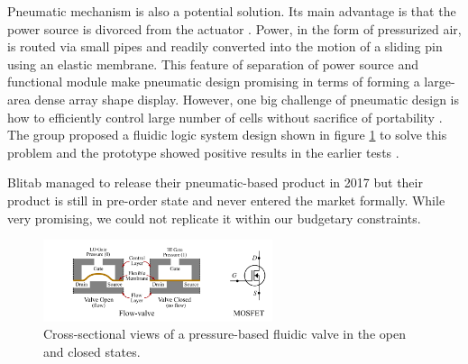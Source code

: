 Pneumatic mechanism is also a potential solution.
Its main advantage is that the power source is divorced from the actuator \cite{russomanno_design_2015}.
Power, in the form of pressurized air, is routed via small pipes and readily converted into the motion of a sliding pin using an elastic membrane.
This feature of separation of power source and functional module make pneumatic design promising in terms of forming a large-area dense array shape display.
However, one big challenge of pneumatic design is how to efficiently control large number of cells without sacrifice of portability \cite{russomanno_model-based_nodate}.
The group proposed a fluidic logic system design shown in figure \ref{fig:pneumatic-schema} to solve this problem and the prototype showed positive results in the earlier tests \cite{russomanno_design_2015}.

Blitab managed to release their pneumatic-based product in 2017 but their product is still in pre-order state and never entered the market formally.
While very promising, we could not replicate it within our budgetary constraints.
\begin{figure}\centering
    \includegraphics[width=0.6\textwidth]{figures/pneumatic-schema.png}
\caption{Cross-sectional views of a pressure-based fluidic valve in the open and closed states.}
\label{fig:pneumatic-schema}
\end{figure}